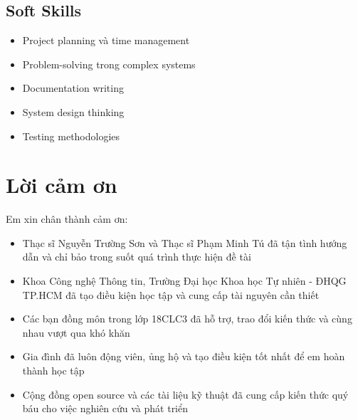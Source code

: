 \documentclass[12pt,a4paper]{report}
\begin{document}
    \subsection{Soft Skills}
    \begin{itemize}
        \item Project planning và time management
        \item Problem-solving trong complex systems
        \item Documentation writing
        \item System design thinking
        \item Testing methodologies
    \end{itemize}

    \section{Lời cảm ơn}
    Em xin chân thành cảm ơn:
    \begin{itemize}
        \item Thạc sĩ Nguyễn Trường Sơn và Thạc sĩ Phạm Minh Tú đã tận tình hướng dẫn và chỉ bảo trong suốt quá trình thực hiện đề tài
        \item Khoa Công nghệ Thông tin, Trường Đại học Khoa học Tự nhiên - ĐHQG TP.HCM đã tạo điều kiện học tập và cung cấp tài nguyên cần thiết
        \item Các bạn đồng môn trong lớp 18CLC3 đã hỗ trợ, trao đổi kiến thức và cùng nhau vượt qua khó khăn
        \item Gia đình đã luôn động viên, ủng hộ và tạo điều kiện tốt nhất để em hoàn thành học tập
        \item Cộng đồng open source và các tài liệu kỹ thuật đã cung cấp kiến thức quý báu cho việc nghiên cứu và phát triển
    \end{itemize}
\end{document}

